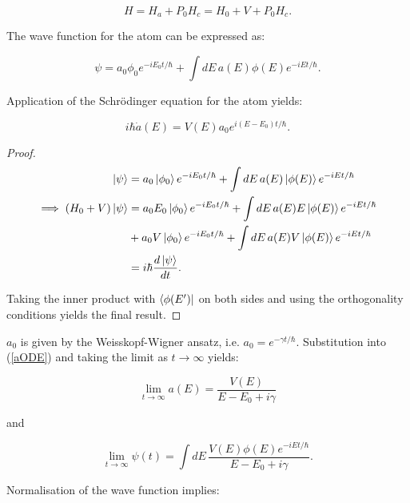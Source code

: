 \documentclass{article}
\begin{document}
\begin{equation}
	H=H_a+P_0H_c=H_0+V+P_0H_c.
\end{equation}

The wave function for the atom can be expressed as:

\begin{equation}
	\psi = a_0\phi_0e^{-iE_0t/\hbar}+\int dE\, a(E)\phi(E)e^{-iEt/\hbar}.
\end{equation}

\noindent Application of the Schr{\"o}dinger equation for the atom yields:

\begin{equation}
	i\hbar \dot{a}(E) = V(E)a_0e^{i(E-E_0)t/\hbar}.
	\label{aODE}
\end{equation}


\begin{proof}
\begin{subequations}
\begin{align}
	\ket{\psi} &= a_0\ket{\phi_0}e^{-iE_0t/\hbar}+\int dE\,a(E)\ket{\phi(E)}e^{-iEt/\hbar} \\
	\implies (H_0+V)\ket{\psi} &= a_0E_0\ket{\phi_0}e^{-iE_0t/\hbar}+\int dE\, a(E)E\ket{\phi(E)}e^{-iEt/\hbar} \\ 
				   &+a_0V\ket{\phi_0}e^{-iE_0t/\hbar}+\int dE\, a(E)V\ket{\phi(E)}e^{-iEt/\hbar} \nonumber\\
				   &= i\hbar \frac{d\ket{\psi}}{dt}.
\end{align}
\end{subequations}

\noindent Taking the inner product with $\bra{\phi(E')}$ on both sides and using the orthogonality conditions yields the final result.
\end{proof}
\noindent $a_0$ is given by the Weisskopf-Wigner ansatz, i.e. $a_0 = e^{-\gamma t/\hbar}$. Substitution into (\ref{aODE}) and taking the limit as $t \rightarrow \infty$ yields:

\begin{equation}
	\lim_{t\to\infty}a(E) = \frac{V(E)}{E-E_0+i\gamma}
\end{equation}

\noindent and 

\begin{equation}
	\lim_{t\to\infty}\psi(t) = \int dE\,\frac{V(E)\phi(E)e^{-iEt/\hbar}}{E-E_0+i\gamma}.
\end{equation}

\noindent Normalisation of the wave function implies:
\end{document}
